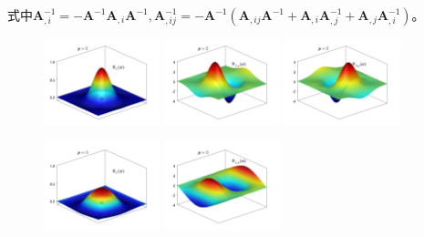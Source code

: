 式中$\pmb A_{,i}^{-1}=-\pmb A^{-1}\pmb A_{,i}\pmb A^{-1},\pmb A_{,ij}^{-1}=-\pmb A^{-1}(\pmb A_{,ij}\pmb A^{-1}+\pmb A_{,i}\pmb A_{,j}^{-1}+\pmb A_{,j}\pmb A_{,i}^{-1})$。\par
\begin{figure}[H]
\centering
\begin{subcaptiongroup}
\includegraphics[width=0.3\textwidth]{figure/nomesh/Qd1.png}
\label{shape}
\includegraphics[width=0.3\textwidth]{figure/nomesh/Qd2.png}
\label{dshape}
\includegraphics[width=0.3\textwidth]{figure/nomesh/Qd3.png}
\label{dshape}
\label{dshape}
\end{subcaptiongroup}
\begin{subcaptiongroup}
\includegraphics[width=0.3\textwidth]{figure/nomesh/C1.png}
\label{shape}
\includegraphics[width=0.3\textwidth]{figure/nomesh/C2.png}

\end{subcaptiongroup}
\end{figure}
